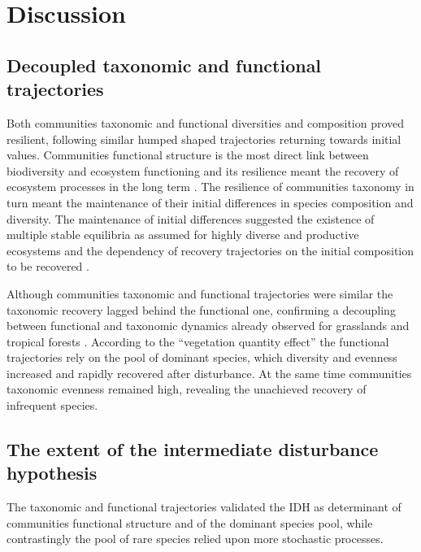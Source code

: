 \documentclass[fleqn,10pt]{ArtEcoFoG} %
\theoremstyle{definition}
\theoremstyle{definition}
\theoremstyle{definition}
\theoremstyle{remark}
\begin{document}
\section{Discussion}\label{discussion}

\subsection{Decoupled taxonomic and functional
trajectories}\label{decoupled-taxonomic-and-functional-trajectories}

Both communities taxonomic and functional diversities and composition
proved resilient, following similar humped shaped trajectories returning
towards initial values. Communities functional structure is the most
direct link between biodiversity and ecosystem functioning
\citep{Diaz2005} and its resilience meant the recovery of ecosystem
processes in the long term \citep{Guariguata2001}. The resilience of
communities taxonomy in turn meant the maintenance of their initial
differences in species composition and diversity. The maintenance of
initial differences suggested the existence of multiple stable
equilibria as assumed for highly diverse and productive ecosystems
\citep{Chase2003} and the dependency of recovery trajectories on the
initial composition to be recovered
\citep{Hubbell1999, Molino2001, Anderson2007, Baraloto2012a}.

Although communities taxonomic and functional trajectories were similar
the taxonomic recovery lagged behind the functional one, confirming a
decoupling between functional and taxonomic dynamics already observed
for grasslands \citep{Tilman1997, Mouillot2011} and tropical forests
\citep{Lohbeck2015, Guariguata2001}. According to the ``vegetation
quantity effect'' \citep{Grime1998} the functional trajectories rely on
the pool of dominant species, which diversity and evenness increased and
rapidly recovered after disturbance. At the same time communities
taxonomic evenness remained high, revealing the unachieved recovery of
infrequent species.

\subsection{The extent of the intermediate disturbance
hypothesis}\label{the-extent-of-the-intermediate-disturbance-hypothesis}

The taxonomic and functional trajectories validated the IDH as
determinant of communities functional structure and of the dominant
species pool, while contrastingly the pool of rare species relied upon
more stochastic processes.
\end{document}
